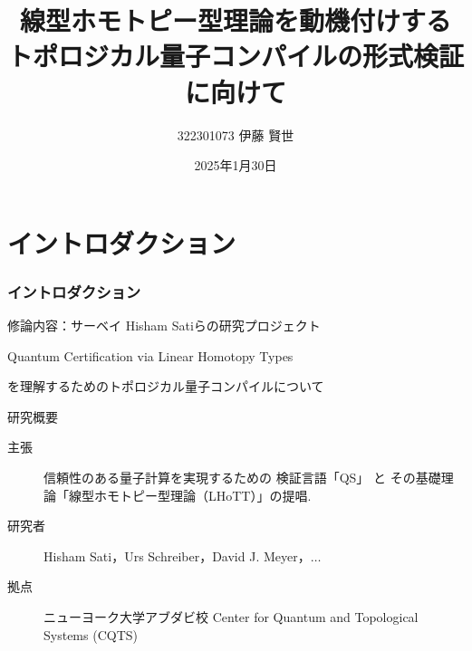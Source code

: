 \documentclass{beamer} %
\title{線型ホモトピー型理論を動機付けする\\
トポロジカル量子コンパイルの形式検証に向けて}
\author{322301073 伊藤 賢世}
\date{2025年1月30日}
\theoremstyle{example}
\begin{document}
\begin{frame}
  \maketitle
\end{frame}

\section{イントロダクション}
\begin{frame}
  \frametitle{イントロダクション}
  \begin{block}{修論内容：サーベイ}
    Hisham Satiらの研究プロジェクト
    \begin{center}
      Quantum Certification
      via Linear Homotopy Types
    \end{center}
    を理解するための\alert{トポロジカル量子コンパイル}について
  \end{block}
  \begin{block}{研究概要}
    \begin{description}
      \item[主張] 信頼性のある量子計算を実現するための
        検証言語「QS」 と
        その基礎理論「線型ホモトピー型理論（LHoTT）」の提唱.
      \item[研究者] Hisham Sati，Urs Schreiber，David J. Meyer，\(\ldots\)
      \item[拠点] ニューヨーク大学アブダビ校
        Center for Quantum and
        Topological Systems (CQTS)
    \end{description}
  \end{block}
\end{frame}
\end{document}
